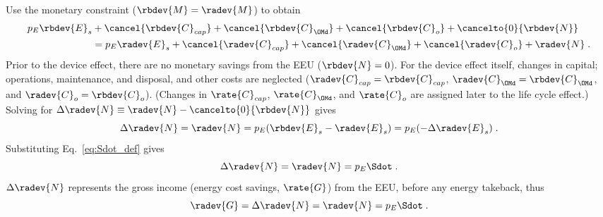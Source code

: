 \begin{landscape}
{Use the monetary constraint ($\rbdev{M} = \radev{M}$) to obtain
%
\begin{align}
  p_E \rbdev{E}_s &+ \cancel{\rbdev{C}_{cap}} + \cancel{\rbdev{C}_{\OMd}} + \cancel{\rbdev{C}_o} + \cancelto{0}{\rbdev{N}} \nonumber \\
                  &= p_E \radev{E}_s + \cancel{\radev{C}_{cap}} + \cancel{\radev{C}_{\OMd}} + \cancel{\radev{C}_o}  + \radev{N} \; .
\end{align}
%
Prior to the device effect, there are no monetary savings from the EEU ($\rbdev{N} = 0$).
For the device effect itself, 
changes in capital; operations, maintenance, and disposal, and other costs are neglected
($\radev{C}_{cap} = \rbdev{C}_{cap}$, $\radev{C}_{\OMd} = \rbdev{C}_{\OMd}$, and $\radev{C}_o = \rbdev{C}_o$).
(Changes in $\rate{C}_{cap}$, $\rate{C}_{\OMd}$, and $\rate{C}_o$ 
are assigned later to the life cycle effect.)
Solving for $\Delta \radev{N} \equiv \radev{N} - \cancelto{0}{\rbdev{N}}$ gives 
%
\begin{equation}
  \Delta \radev{N} = \radev{N} = p_E(\rbdev{E}_s - \radev{E}_s) = p_E (-\Delta \radev{E}_s) \; .
\end{equation}
%
Substituting Eq.~\ref{eq:Sdot_def} gives
%
\begin{equation}
  \Delta \radev{N} = \radev{N} = p_E \Sdot \; .
\end{equation}
%
$\Delta \radev{N}$ represents the gross income (energy cost savings, $\rate{G}$) from the EEU, 
before any energy takeback, thus
%
\begin{equation} \label{eq:G_dot}
  \radev{G} = \Delta \radev{N} = \radev{N} = p_E \Sdot \; .
\end{equation}
}

\end{landscape}
